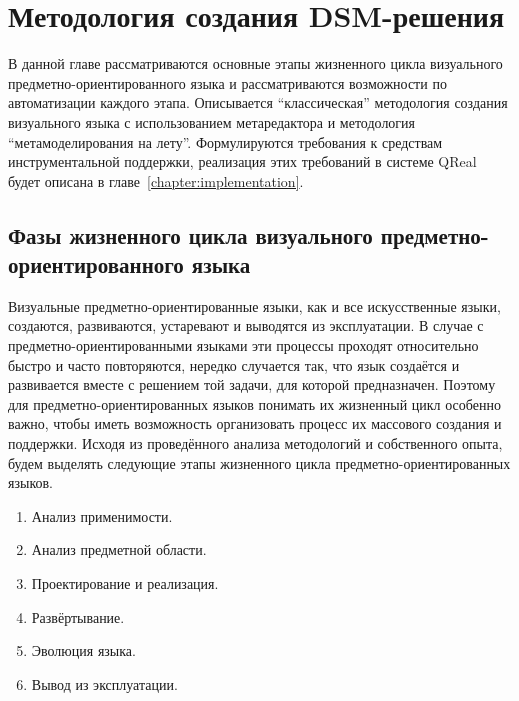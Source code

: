 \chapter{Методология создания DSM-решения}
В данной главе рассматриваются основные этапы жизненного цикла визуального предметно-ориентированного 
языка и рассматриваются возможности по автоматизации каждого этапа. Описывается "`классическая"' 
методология создания визуального языка с использованием метаредактора и методология 
"`метамоделирования на лету"'. Формулируются требования к средствам инструментальной 
поддержки, реализация этих требований в системе QReal будет описана в главе~\ref{chapter:implementation}.

\section{Фазы жизненного цикла визуального предметно-ориентированного языка}
Визуальные предметно-ориентированные языки, как и все искусственные языки, создаются, 
развиваются, устаревают и выводятся из эксплуатации. В случае с предметно-ориентированными 
языками эти процессы проходят относительно быстро и часто повторяются, нередко случается 
так, что язык создаётся и развивается вместе с решением той задачи, для которой предназначен. 
Поэтому для предметно-ориентированных языков понимать их жизненный цикл особенно важно, 
чтобы иметь возможность организовать процесс их массового создания и поддержки. Исходя 
из проведённого анализа методологий и собственного опыта, будем выделять следующие 
этапы жизненного цикла предметно-ориентированных языков.

\begin{enumerate}
	\item Анализ применимости. 
	\item Анализ предметной области.
	\item Проектирование и реализация.
	\item Развёртывание.
	\item Эволюция языка.
	\item Вывод из эксплуатации.
\end{enumerate}


